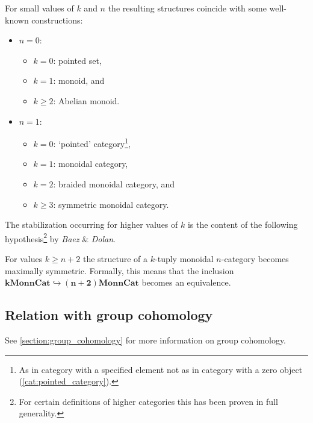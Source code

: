     \begin{example}
        For small values of $k$ and $n$ the resulting structures coincide with some well-known constructions:
        \begin{itemize}
            \item $n=0$:
                \begin{itemize}
                    \item $k=0$: pointed set,
                    \item $k=1$: monoid, and
                    \item $k\geq2$: Abelian monoid.
                \end{itemize}
            \item $n=1$:
                \begin{itemize}
                    \item $k=0$: `pointed' category\footnote{As in category with a specified element not as in category with a zero object (\cref{cat:pointed_category}).},
                    \item $k=1$: monoidal category,
                    \item $k=2$: braided monoidal category, and
                    \item $k\geq3$: symmetric monoidal category.
                \end{itemize}
        \end{itemize}
    \end{example}
    The stabilization occurring for higher values of $k$ is the content of the following hypothesis\footnote{For certain definitions of higher categories this has been proven in full generality.} by \textit{Baez} \& \textit{Dolan}.
    \begin{theorem}
        For values $k\geq n+2$ the structure of a $k$-tuply monoidal $n$-category becomes maximally symmetric. Formally, this means that the inclusion \emph{$\symbf{k}\mathbf{Mon}\symbf{n}\mathbf{Cat}\hookrightarrow\symbf{(n+2)}\mathbf{Mon}\symbf{n}\mathbf{Cat}$} becomes an equivalence.
    \end{theorem}

\subsection{Relation with group cohomology}\label{section:hda_group_cohomology}

    See \cref{section:group_cohomology} for more information on group cohomology.

